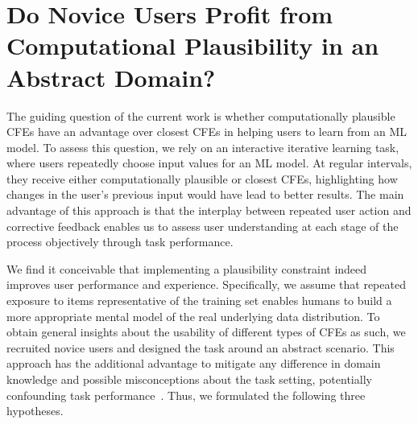 
\section{Do Novice Users Profit from Computational Plausibility in an Abstract Domain?}\label{sec:hypotheses}


The guiding question of the current work is whether computationally plausible \glspl{CFE} have an advantage over closest \glspl{CFE} in helping users to learn from an \gls{ML} model.
To assess this question, we rely on an interactive iterative learning task, where users repeatedly choose input values for an \gls{ML} model.
At regular intervals, they receive either computationally plausible or closest \glspl{CFE}, highlighting how changes in the user's previous input would have lead to better results.
The main advantage of this approach is that the interplay between repeated user action and corrective feedback enables us to assess user understanding at each stage of the process objectively through task performance.

We find it conceivable that implementing a plausibility constraint indeed improves user performance and experience. 
Specifically, we assume that repeated exposure to items representative of the training set enables humans to build a more appropriate mental model of the real underlying data distribution.
To obtain general insights about the usability of different types of \glspl{CFE} as such, we recruited novice users and designed the task around an abstract scenario.
This approach has the additional advantage to mitigate any difference in domain knowledge and possible misconceptions about the task setting, potentially confounding task performance~\citep{van_der_waa_evaluating_2021}.
Thus, we formulated the following three hypotheses.

